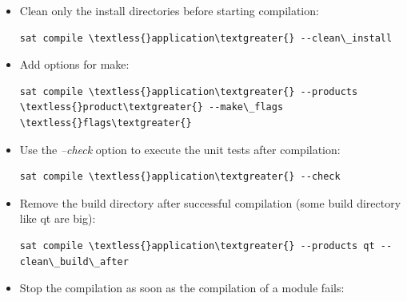 \documentclass[a4paper,10pt,english]{sphinxmanual}
\begin{document}
\begin{itemize}
\begin{Verbatim}[commandchars=\\\{\}]
sat compile \textless{}application\textgreater{} --products GEOM  --clean\_all
\end{Verbatim}

\begin{notice}{note}{Note:}
\end{notice}

\item {} 
Clean only the install directories before starting compilation:

\begin{Verbatim}[commandchars=\\\{\}]
sat compile \textless{}application\textgreater{} --clean\_install
\end{Verbatim}

\item {} 
Add options for make:

\begin{Verbatim}[commandchars=\\\{\}]
sat compile \textless{}application\textgreater{} --products \textless{}product\textgreater{} --make\_flags \textless{}flags\textgreater{}
\end{Verbatim}

\item {} 
Use the \emph{--check} option to execute the unit tests after compilation:

\begin{Verbatim}[commandchars=\\\{\}]
sat compile \textless{}application\textgreater{} --check
\end{Verbatim}

\item {} 
Remove the build directory after successful compilation (some build directory like qt are big):

\begin{Verbatim}[commandchars=\\\{\}]
sat compile \textless{}application\textgreater{} --products qt --clean\_build\_after
\end{Verbatim}

\item {} 
Stop the compilation as soon as the compilation of a module fails:


\end{itemize}
\end{document}
